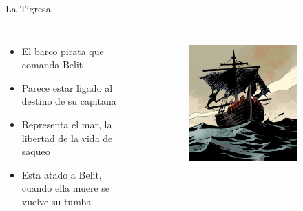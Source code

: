 \begin{frame}{La Tigresa}
	\begin{columns}
		\begin{itemize}
			\item El barco pirata que comanda Belit
			\item Parece estar ligado al destino de su capitana
			\item Representa el mar, la libertad de la vida de saqueo
			\item Esta atado a Belit, cuando ella muere se vuelve su tumba
		\end{itemize}
		\begin{figure}[htp]
			\centering
			\begin{subfigure}[b]{0.27\textwidth}
				\includegraphics[width=\textwidth]{img/tigresa/DH}
			\end{subfigure}
			~
			\begin{subfigure}[b]{0.25\textwidth}

\end{subfigure}
\end{figure}
\end{columns}
\end{frame}
